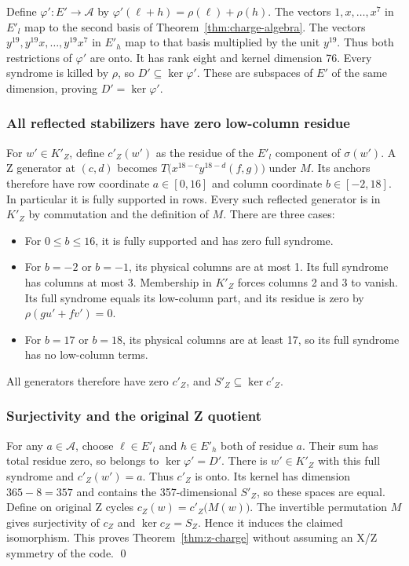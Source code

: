 \documentclass{article}
\begin{document}
Define \(\varphi' \colon E' \to \mathcal{A}\) by \(\varphi'(\ell + h) = \rho(\ell) + \rho(h)\).
The vectors \(1, x, \dots, x^7\) in \(E'_l\) map to the second basis of
Theorem~\ref{thm:charge-algebra}. The vectors \(y^{19}, y^{19} x, \dots, y^{19} x^7\) in
\(E'_h\) map to that basis multiplied by the unit \(y^{19}\).
Thus both restrictions of \(\varphi'\) are onto. It has rank eight and
kernel dimension 76.
Every syndrome is killed by \(\rho\), so \(D' \subseteq \ker \varphi'\).
These are subspaces of \(E'\) of the same dimension, proving
\(D' = \ker \varphi'\).

\subsubsection{All reflected stabilizers have zero low-column residue}\label{app:z-stabilizers}

For \(w' \in K'_Z\), define \(c'_Z(w')\) as the residue of the
\(E'_l\) component of \(\sigma(w')\).
A Z generator at \((c,d)\) becomes
\(T\bigl(x^{18-c} y^{18-d} (f, g)\bigr)\) under \(M\).
Its anchors therefore have row coordinate \(a \in [0,16]\) and column
coordinate \(b \in [-2,18]\). In particular it is fully supported in rows.
Every such reflected generator is in \(K'_Z\) by commutation and the
definition of \(M\). There are three cases:

\begin{itemize}
  \item For \(0 \le b \le 16\), it is fully supported and has zero full syndrome.
  \item For \(b = -2\) or \(b = -1\), its physical columns are at most 1.
    Its full syndrome has columns at most 3. Membership in \(K'_Z\)
    forces columns 2 and 3 to vanish. Its full syndrome equals its
    low-column part, and its residue is zero by \(\rho(gu' + fv') = 0\).
  \item For \(b = 17\) or \(b = 18\), its physical columns are at least 17,
    so its full syndrome has no low-column terms.
\end{itemize}

All generators therefore have zero \(c'_Z\), and
\(S'_Z \subseteq \ker c'_Z\).

\subsubsection{Surjectivity and the original Z quotient}\label{app:z-quotient}

For any \(a \in \mathcal{A}\), choose \(\ell \in E'_l\) and \(h \in E'_h\)
both of residue \(a\). Their sum has total residue zero, so belongs to
\(\ker \varphi' = D'\). There is \(w' \in K'_Z\) with this full syndrome and
\(c'_Z(w') = a\). Thus \(c'_Z\) is onto.
Its kernel has dimension \(365 - 8 = 357\) and contains the
357-dimensional \(S'_Z\), so these spaces are equal.
Define on original Z cycles \(c_Z(w) = c'_Z\bigl(M(w)\bigr)\).
The invertible permutation \(M\) gives surjectivity of \(c_Z\) and
\(\ker c_Z = S_Z\). Hence it induces the claimed isomorphism.
This proves Theorem~\ref{thm:z-charge} without assuming an X/Z symmetry of the code.
\qed
\end{document}
